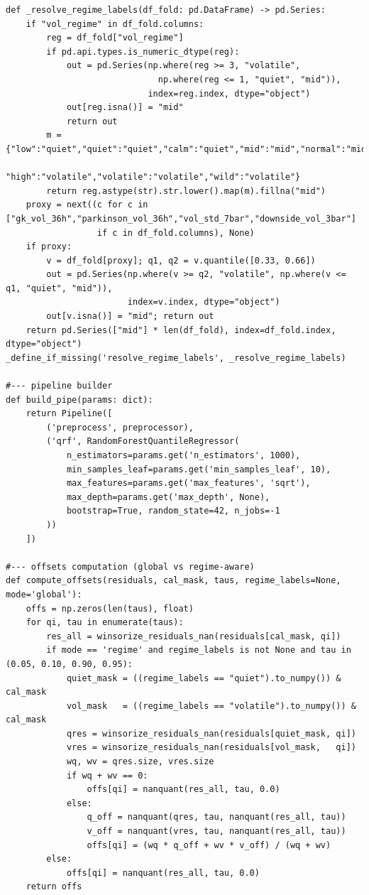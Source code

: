 \documentclass[
  a4paper,
  DIV=11,
  numbers=noendperiod]{scrreprt}
\begin{document}
\begin{verbatim}
def _resolve_regime_labels(df_fold: pd.DataFrame) -> pd.Series:
    if "vol_regime" in df_fold.columns:
        reg = df_fold["vol_regime"]
        if pd.api.types.is_numeric_dtype(reg):
            out = pd.Series(np.where(reg >= 3, "volatile",
                              np.where(reg <= 1, "quiet", "mid")),
                            index=reg.index, dtype="object")
            out[reg.isna()] = "mid"
            return out
        m = {"low":"quiet","quiet":"quiet","calm":"quiet","mid":"mid","normal":"mid",
             "high":"volatile","volatile":"volatile","wild":"volatile"}
        return reg.astype(str).str.lower().map(m).fillna("mid")
    proxy = next((c for c in ["gk_vol_36h","parkinson_vol_36h","vol_std_7bar","downside_vol_3bar"]
                  if c in df_fold.columns), None)
    if proxy:
        v = df_fold[proxy]; q1, q2 = v.quantile([0.33, 0.66])
        out = pd.Series(np.where(v >= q2, "volatile", np.where(v <= q1, "quiet", "mid")),
                        index=v.index, dtype="object")
        out[v.isna()] = "mid"; return out
    return pd.Series(["mid"] * len(df_fold), index=df_fold.index, dtype="object")
_define_if_missing('resolve_regime_labels', _resolve_regime_labels)

#--- pipeline builder 
def build_pipe(params: dict):
    return Pipeline([
        ('preprocess', preprocessor),
        ('qrf', RandomForestQuantileRegressor(
            n_estimators=params.get('n_estimators', 1000),
            min_samples_leaf=params.get('min_samples_leaf', 10),
            max_features=params.get('max_features', 'sqrt'),
            max_depth=params.get('max_depth', None),
            bootstrap=True, random_state=42, n_jobs=-1
        ))
    ])

#--- offsets computation (global vs regime-aware) 
def compute_offsets(residuals, cal_mask, taus, regime_labels=None, mode='global'):
    offs = np.zeros(len(taus), float)
    for qi, tau in enumerate(taus):
        res_all = winsorize_residuals_nan(residuals[cal_mask, qi])
        if mode == 'regime' and regime_labels is not None and tau in (0.05, 0.10, 0.90, 0.95):
            quiet_mask = ((regime_labels == "quiet").to_numpy()) & cal_mask
            vol_mask   = ((regime_labels == "volatile").to_numpy()) & cal_mask
            qres = winsorize_residuals_nan(residuals[quiet_mask, qi])
            vres = winsorize_residuals_nan(residuals[vol_mask,   qi])
            wq, wv = qres.size, vres.size
            if wq + wv == 0:
                offs[qi] = nanquant(res_all, tau, 0.0)
            else:
                q_off = nanquant(qres, tau, nanquant(res_all, tau))
                v_off = nanquant(vres, tau, nanquant(res_all, tau))
                offs[qi] = (wq * q_off + wv * v_off) / (wq + wv)
        else:
            offs[qi] = nanquant(res_all, tau, 0.0)
    return offs


\end{verbatim}
\end{document}
